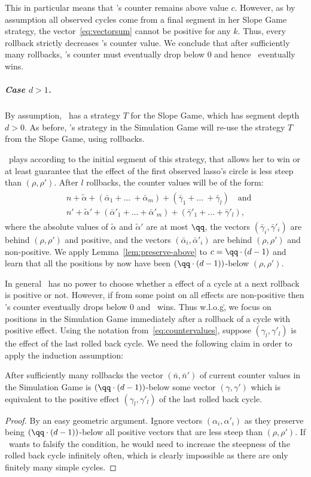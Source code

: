 This in particular means that \R's counter remains above value $c$.
However, as by assumption all observed cycles come from a final segment in her Slope Game strategy,
the vector~\eqref{eq:vectorsum} cannot be positive for any $k$. Thus, every rollback strictly
decreases \V's counter value.
We conclude that after sufficiently many rollbacks, \V's counter must eventually drop below $0$ and
hence \R\ eventually wins.
\subparagraph*{Case $d > 1$.} 
By assumption, \R\ has a strategy $T$ for the Slope Game, which has segment depth $d>0$.
As before, \R's strategy in the Simulation Game will re-use the strategy $T$
from the Slope Game, using rollbacks.

\R\ plays according to the initial segment of this strategy, that allows her to win or at least
guarantee that the effect of the first observed lasso's circle is less steep than $(\rho,\rho')$.
After $l$ rollbacks, the counter values will be of the form:
\begin{align} \label{eq:countervalues}
\begin{aligned}
  &n + \widetilde\alpha + (\bar\alpha_1 + \ldots \ + \bar\alpha_{m})  + (\bar\gamma_1 +\ldots \ + \bar\gamma_{l})\quad\text{and}\\
  &n' + \widetilde\alpha' + (\bar\alpha'_1 + \ldots + \bar\alpha'_{m}) + (\bar\gamma'_1 + \ldots + \bar\gamma'_{l}),
 \end{aligned}
\end{align}
where the absolute values of $\widetilde\alpha$ and $\widetilde\alpha'$ are at most $\qq$,
the vectors $(\bar\gamma_i,\bar\gamma'_i)$ are behind $(\rho,\rho')$ and positive,
and the vectors $(\bar\alpha_i,\bar\alpha'_i)$ are behind $(\rho,\rho')$ and non-positive.
We apply Lemma~\ref{lem:preserve-above} to $c = \qq\cdot(d-1)$ and learn
that all the positions by now have been $(\qq\cdot(d-1))$-below $(\rho,\rho')$.

In general \R\ has no power to choose whether a effect of a cycle at a next rollback is positive or not.
However, if from some point on all effects are non-positive then \V's counter
eventually drops below $0$ and \R\ wins.
Thus w.l.o.g\., we focus on positions in the Simulation Game immediately after a rollback of a
cycle with positive effect.
Using the notation from~\eqref{eq:countervalues}, suppose $(\gamma_l,\gamma'_l)$ 
is the effect of the last rolled back cycle.
We need the following claim in order to apply the induction assumption:
\begin{claim}
  After sufficiently many rollbacks the vector $(\bar n, \bar n')$ of current counter values
  in the Simulation Game is $(\qq\cdot(d-1))$-below some vector $(\gamma,\gamma')$
  which is equivalent to the positive effect $(\gamma_l,\gamma'_l)$ of the last rolled back cycle.
\end{claim}
\begin{proof}
  By an easy geometric argument. Ignore vectors $(\alpha_i,\alpha'_i)$ as they
  preserve being $(\qq\cdot(d-1))$-below all positive vectors that are less steep
  than $(\rho,\rho')$.  If \V\ wants to falsify the condition, he would need to
  increase the steepness of the rolled back cycle infinitely often, which is
  clearly impossible as there are only finitely many simple cycles.
\end{proof}


